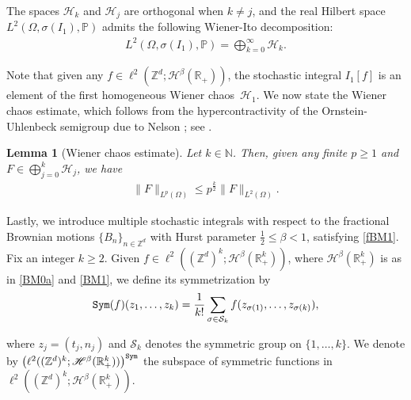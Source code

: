 \documentclass[letterpaper, 11pt,  reqno]{amsart}
\newtheorem{lemma}[theorem]{Lemma}
\newcommand{\1}{\hspace{0.5mm}\textup{I}\hspace{0.5mm}}
\newcommand{\noi}{\noindent}
\newcommand{\Z}{\mathbb{Z}}
\newcommand{\R}{\mathbb{R}}
\newcommand{\PP}{\mathbb{P}}
\renewcommand{\H}{\mathcal{H}}
\newcommand{\be}{\beta}
\newcommand{\s}{\sigma}
\renewcommand{\l}{\ell}
\renewcommand{\S}{\mathcal{S}}
\newcommand{\N}{\mathbb{N}}
\newcommand{\Hs}{\mathscr{H}}
\newcommand{\HH}{\mathcal{H}}
\newcommand{\Sym}{\textup{\texttt{Sym}}}
\numberwithin{equation}{section}
\numberwithin{theorem}{section}
\begin{document}
\noi
The spaces $\HH_k$ and $\HH_j$ are orthogonal when $k\neq j$, 
and the real Hilbert space $L^2(\Omega, \s(I_1), \PP)$ admits the following 
Wiener-Ito decomposition: %
\begin{align*}
L^2(\Omega, \s(I_1), \PP) = \bigoplus_{k=0}^\infty \HH_k.
\end{align*}


\noi
Note that given any $f\in \l^2(\Z^d;\Hs^\be(\R_+))$, the stochastic integral $I_1[f]$ is an element of the first 
homogeneous Wiener chaos~$\HH_1$.
We now state the Wiener chaos estimate, which follows from the hypercontractivity of the Ornstein-Uhlenbeck semigroup
 due to Nelson \cite{Nelson2};
 see 
 \cite[Theorem~I.22]{Simon}.

\begin{lemma}[Wiener chaos estimate]
\label{LEM:WCE}
Let $k\in\N$.
Then, given any finite $p \ge 1$ and $F \in 
\bigoplus_{j=0}^k \HH_j$, 
 we have
\begin{align*}
\| F \|_{L^p(\Omega)} \le p^{\frac k 2 } \| F \|_{L^2(\Omega)}.
\end{align*}

\end{lemma}








Lastly, we introduce multiple stochastic integrals with respect to the fractional Brownian motions 
$\{B_n\}_{n\in\Z^d}$ with Hurst parameter $\frac 12  \le \be < 1$, satisfying \eqref{fBM1}.
Fix  an integer $k \ge 2$.
Given  $f\in \l^2( (\Z^d)^{k} ; \Hs^\be(\R_+^{k})  )$, where 
$\Hs^\be(\R_+^{k})$ 
is as in  \eqref{BM0a}
and \eqref{BM1},  
 we define its symmetrization by
\begin{align*}
\Sym(f) (z_1,  \ldots, z_k)  
= \frac{1}{k!} \sum_{\s\in \S_k} f(z_{\s(1)},  \ldots, z_{\s(k)}),
\end{align*}


\noi
where 
$z_j = (t_j, n_j)$
and $\S_k$ denotes the symmetric group on $\{1, \dots, k\}$.
We denote by  
$\big(\l^2( (\Z^d)^{k} ; \Hs^\be(\R_+^{k})  )\big)^{ \Sym}$  the subspace of symmetric functions in 
$\l^2( (\Z^d)^{k} ; \Hs^\be(\R_+^{k})  )$.

\end{document}
